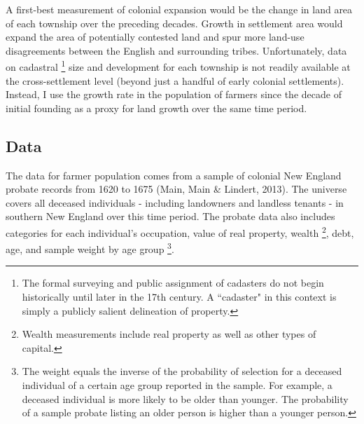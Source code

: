 \documentclass[sn-mathphys]{sn-jnl}%
\theoremstyle{thmstyleone}%
\theoremstyle{thmstyletwo}%
\theoremstyle{thmstylethree}%
\begin{document}
A first-best measurement of colonial expansion would be the change in land area of each township over the preceding decades. Growth in settlement area would expand the area of potentially contested land and spur more land-use disagreements between the English and surrounding tribes. Unfortunately, data on cadastral \footnote{The formal surveying and public assignment of cadasters do not begin historically until later in the 17th century. A ``cadaster" in this context is simply a publicly salient delineation of property.} size and development for each township is not readily available at the cross-settlement level (beyond just a handful of early colonial settlements). Instead, I use the growth rate in the population of farmers since the decade of initial founding as a proxy for land growth over the same time period.

\subsection{Data}

The data for farmer population comes from a sample of colonial New England probate records from 1620 to 1675 (Main, Main \& Lindert, 2013). The universe covers all deceased individuals - including landowners and landless tenants - in southern New England over this time period. The probate data also includes categories for each individual's occupation, value of real property, wealth \footnote{Wealth measurements include real property as well as other types of capital.}, debt, age, and sample weight by age group \footnote{The weight equals the inverse of the probability of selection for a deceased individual of a certain age group reported in the sample. For example, a deceased individual is more likely to be older than younger. The probability of a sample probate listing an older person is higher than a younger person.}.


\end{document}
